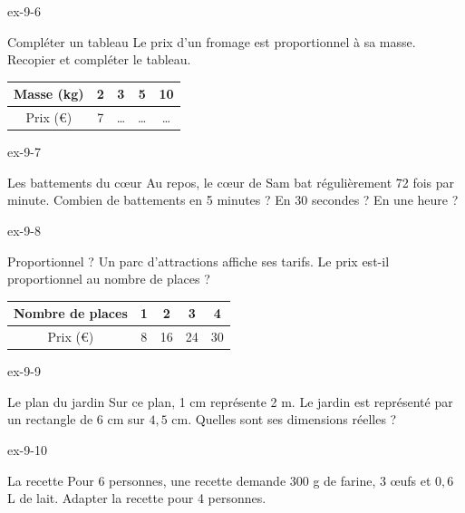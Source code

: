 \begin{blocLivre}{ex-9-6}\begin{exercice}[2]{Compléter un tableau}
Le prix d’un fromage est proportionnel à sa masse. Recopier et compléter le tableau.\begin{center}\renewcommand{\arraystretch}{1.35}\begin{tabular}{c|cccc}\toprule
Masse (kg) & 2 & 3 & 5 & 10\\\midrule
Prix (€) & 7 & … & … & …\\
\bottomrule\end{tabular}\end{center}
\end{exercice}\end{blocLivre}
\begin{blocLivre}{ex-9-7}\begin{exercice}[2]{Les battements du cœur}
Au repos, le cœur de Sam bat régulièrement 72 fois par minute. Combien de battements en 5 minutes ? En 30 secondes ? En une heure ?
\end{exercice}\end{blocLivre}
\begin{blocLivre}{ex-9-8}\begin{exercice}[2]{Proportionnel ?}
Un parc d’attractions affiche ses tarifs. Le prix est-il proportionnel au nombre de places ?\begin{center}\renewcommand{\arraystretch}{1.35}\begin{tabular}{c|cccc}\toprule
Nombre de places & 1 & 2 & 3 & 4\\\midrule
Prix (€) & 8 & 16 & 24 & 30\\
\bottomrule\end{tabular}\end{center}
\end{exercice}\end{blocLivre}
\begin{blocLivre}{ex-9-9}\begin{exercice}[2]{Le plan du jardin}
Sur ce plan, 1 cm représente 2 m. Le jardin est représenté par un rectangle de 6 cm sur $4{,}5$ cm. Quelles sont ses dimensions réelles ?
\label{fig-ex-9-9}
\end{exercice}\end{blocLivre}
\begin{blocLivre}{ex-9-10}\begin{exercice}[2]{La recette}
Pour 6 personnes, une recette demande 300 g de farine, 3 œufs et $0{,}6$ L de lait. Adapter la recette pour 4 personnes.
\end{exercice}\end{blocLivre}

